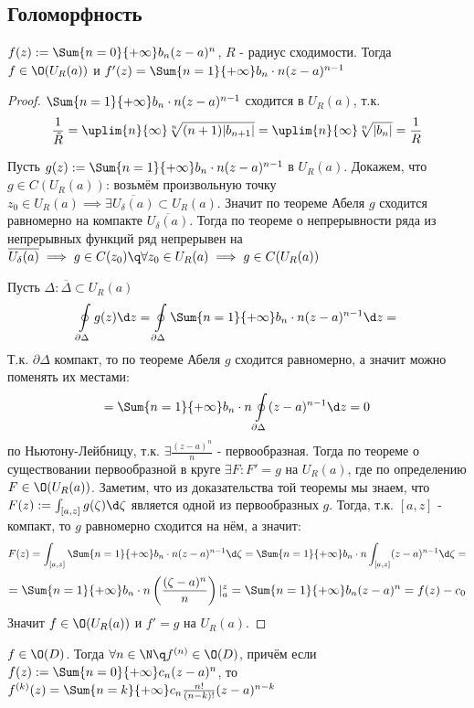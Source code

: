 \subsection{Голоморфность}
\begin{theorem}
  $f(z):=\Sum{n=0}{+\infty}b_n(z-a)^n$, $R$ - радиус сходимости. Тогда $f\in\O(U_R(a))$ и $f'(z)=\Sum{n=1}{+\infty}b_n\cdot n(z-a)^{n-1}$ 
\end{theorem}
\begin{proof}
   $\Sum{n=1}{+\infty}b_n\cdot n(z-a)^{n-1}$ сходится в $U_R(a)$, т.к. \[\frac{1}{\tilde{R}}=\uplim{n}{\infty}\sqrt[n]{(n+1)|b_{n+1}|}=\uplim{n}{\infty}\sqrt[n]{|b_{n}|}=\frac{1}{R}\]

   Пусть $g(z):=\Sum{n=1}{+\infty}b_n\cdot n(z-a)^{n-1}$ в $U_R(a)$. Докажем, что $g\in C(U_R(a))$: возьмём произвольную точку $z_0\in U_R(a)\implies \exists \overline{U_\delta(a)}\subset U_R(a)$. Значит по теореме Абеля $g$ сходится равномерно на компакте $\overline{U_\delta(a)}$. Тогда по теореме о непрерывности ряда из непрерывных функций ряд непрерывен на $\overline{U_\delta(a)}\implies g\in C(z_0)\q\forall z_0\in U_R(a)\implies g\in C(U_R(a))$
 
  Пусть $\Delta\colon \overline{\Delta}\subset U_R(a)$
  \[\oint\limits_{\partial\Delta}g(z)\d z = \oint\limits_{\partial\Delta}\Sum{n=1}{+\infty}b_n\cdot n(z-a)^{n-1}\d z=\]
  Т.к. $\partial\Delta$ компакт, то по теореме Абеля $g$ сходится равномерно, а значит можно поменять их местами: 
  \[=\Sum{n=1}{+\infty}b_n\cdot n\oint\limits_{\partial\Delta}(z-a)^{n-1}\d z=0\]
  по Ньютону-Лейбницу, т.к. $\exists \frac{(z-a)^n}{n}$ - первообразная. Тогда по теореме о существовании первообразной в круге $\exists F\colon F'=g$ на $U_R(a)$, где по определению $F\in\O(U_R(a))$. Заметим, что из доказательства той теоремы мы знаем, что $F(z):=\int_{[a,z]}g(\zeta)\d \zeta$ является одной из первообразных $g$. Тогда, т.к. $[a,z]$ - компакт, то $g$ равномерно сходится на нём, а значит:
    \[F(z)=\int_{[a,z]}\Sum{n=1}{+\infty}b_n\cdot n(z-a)^{n-1}\d \zeta=\Sum{n=1}{+\infty}b_n\cdot n\int_{[a,z]}(z-a)^{n-1}\d \zeta=\]
    \[=\Sum{n=1}{+\infty}b_n\cdot n \left(\frac{(\zeta-a)^n}{n}\right)|_a^z=\Sum{n=1}{+\infty}b_n(z-a)^n=f(z) - c_0\]
    Значит $f\in\O(U_R(a))$ и $f'=g$ на $U_R(a)$. 
\end{proof}
\begin{theorem}
  $f\in\O(D)$. Тогда $\forall n\in\N\q f^{(n)}\in \O(D)$, причём если $f(z):=\Sum{n=0}{+\infty}c_n(z-a)^n$, то $f^{(k)}(z)=\Sum{n=k}{+\infty}c_n \frac{n!}{(n-k)!}(z-a)^{n-k}$ 
\end{theorem}
